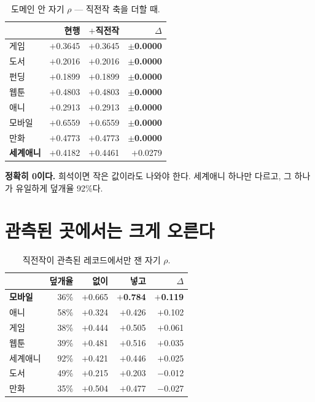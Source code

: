 \documentclass[10pt]{article}
\begin{document}
\begin{table}[t]
\centering\tsize
\caption{도메인 안 자기 $\rho$ --- 직전작 축을 더할 때.}
\begin{tabular}{lrrr}
\toprule
& 현행 & $+$직전작 & $\Delta$ \\
\midrule
게임 & $+$0.3645 & $+$0.3645 & \textbf{$\pm$0.0000} \\
도서 & $+$0.2016 & $+$0.2016 & \textbf{$\pm$0.0000} \\
펀딩 & $+$0.1899 & $+$0.1899 & \textbf{$\pm$0.0000} \\
웹툰 & $+$0.4803 & $+$0.4803 & \textbf{$\pm$0.0000} \\
애니 & $+$0.2913 & $+$0.2913 & \textbf{$\pm$0.0000} \\
모바일 & $+$0.6559 & $+$0.6559 & \textbf{$\pm$0.0000} \\
만화 & $+$0.4773 & $+$0.4773 & \textbf{$\pm$0.0000} \\
\textbf{세계애니} & $+$0.4182 & $+$0.4461 & $+$0.0279 \\
\bottomrule
\end{tabular}
\end{table}

\textbf{정확히 0이다.} 희석이면 작은 값이라도 나와야 한다. 세계애니 하나만
다르고, 그 하나가 유일하게 덮개율 92\%다.


\section{관측된 곳에서는 크게 오른다}

\begin{table}[t]
\centering\tsize
\caption{직전작이 관측된 레코드에서만 잰 자기 $\rho$.}
\begin{tabular}{lrrrr}
\toprule
& 덮개율 & 없이 & 넣고 & $\Delta$ \\
\midrule
\textbf{모바일} & 36\% & $+$0.665 & \textbf{$+$0.784} & \textbf{$+$0.119} \\
애니 & 58\% & $+$0.324 & $+$0.426 & $+$0.102 \\
게임 & 38\% & $+$0.444 & $+$0.505 & $+$0.061 \\
웹툰 & 39\% & $+$0.481 & $+$0.516 & $+$0.035 \\
세계애니 & 92\% & $+$0.421 & $+$0.446 & $+$0.025 \\
도서 & 49\% & $+$0.215 & $+$0.203 & $-$0.012 \\
만화 & 35\% & $+$0.504 & $+$0.477 & $-$0.027 \\
\bottomrule
\end{tabular}
\end{table}
\end{document}
